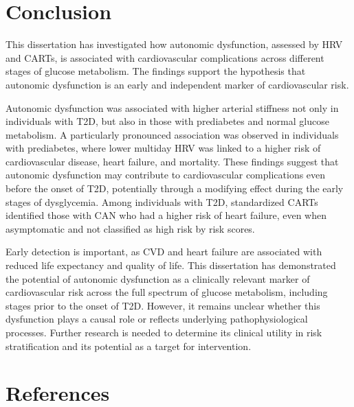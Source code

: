 \documentclass[
  letterpaper,
  headsepline=true,
  open=any]{scrbook}
\begin{document}

\hypertarget{conclusion}{%
\chapter{Conclusion}\label{conclusion}}

\newpage

This dissertation has investigated how autonomic dysfunction, assessed
by HRV and CARTs, is associated with cardiovascular complications across
different stages of glucose metabolism. The findings support the
hypothesis that autonomic dysfunction is an early and independent marker
of cardiovascular risk.

Autonomic dysfunction was associated with higher arterial stiffness not
only in individuals with T2D, but also in those with prediabetes and
normal glucose metabolism. A particularly pronounced association was
observed in individuals with prediabetes, where lower multiday HRV was
linked to a higher risk of cardiovascular disease, heart failure, and
mortality. These findings suggest that autonomic dysfunction may
contribute to cardiovascular complications even before the onset of T2D,
potentially through a modifying effect during the early stages of
dysglycemia. Among individuals with T2D, standardized CARTs identified
those with CAN who had a higher risk of heart failure, even when
asymptomatic and not classified as high risk by risk scores.

Early detection is important, as CVD and heart failure are associated
with reduced life expectancy and quality of life. This dissertation has
demonstrated the potential of autonomic dysfunction as a clinically
relevant marker of cardiovascular risk across the full spectrum of
glucose metabolism, including stages prior to the onset of T2D. However,
it remains unclear whether this dysfunction plays a causal role or
reflects underlying pathophysiological processes. Further research is
needed to determine its clinical utility in risk stratification and its
potential as a target for intervention.


\hypertarget{references}{%
\chapter*{References}\label{references}}

\end{document}

